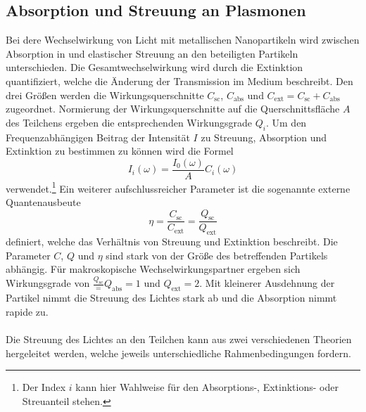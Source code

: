\subsection{Absorption und Streuung an Plasmonen}
Bei dere Wechselwirkung von Licht mit metallischen Nanopartikeln wird zwischen Absorption in und elastischer Streuung an den beteiligten Partikeln unterschieden. Die Gesamtwechselwirkung wird durch die Extinktion quantifiziert, welche die Änderung der Transmission im Medium beschreibt.
Den drei Größen werden die Wirkungsquerschnitte $C_{\text{sc}}$, $C_{\text{abs}}$ und $C_{\text{ext}} = C_{\text{sc}} + C_{\text{abs}}$ zugeordnet.
Normierung der Wirkungsquerschnitte auf die Querschnittsfläche $A$ des Teilchens ergeben die entsprechenden Wirkungsgrade $Q_i$. Um den Frequenzabhängigen Beitrag der Intensität $I$ zu Streuung, Absorption und Extinktion zu bestimmen zu können wird die Formel
\begin{equation}
  I_i(\omega) = \frac{I_0(\omega)}{A} C_i(\omega)
  \label{eqn:intensität}
\end{equation}
verwendet.\footnote{Der Index $i$ kann hier Wahlweise für den Absorptions-, Extinktions- oder Streuanteil stehen.} Ein weiterer aufschlussreicher Parameter ist die sogenannte externe Quantenausbeute
\begin{equation}
  \eta = \frac{C_{\text{sc}}}{C_{\text{ext}}} = \frac{Q_{\text{sc}}}{Q_{\text{ext}}}
\end{equation}
definiert, welche das Verhältnis von Streuung und Extinktion beschreibt. Die Parameter $C$, $Q$ und $\eta$ sind stark von der Größe des betreffenden Partikels abhängig. Für makroskopische Wechselwirkungspartner ergeben sich Wirkungsgrade von $\frac{Q_{\text{sc}}} = {Q_{\text{abs}}} = 1$ und $Q_{\text{ext}} = 2$. Mit kleinerer Ausdehnung der Partikel nimmt die Streuung des Lichtes stark ab und die Absorption nimmt rapide zu.\\
\\
Die Streuung des Lichtes an den Teilchen kann aus zwei verschiedenen Theorien hergeleitet werden, welche jeweils unterschiedliche Rahmenbedingungen fordern.

